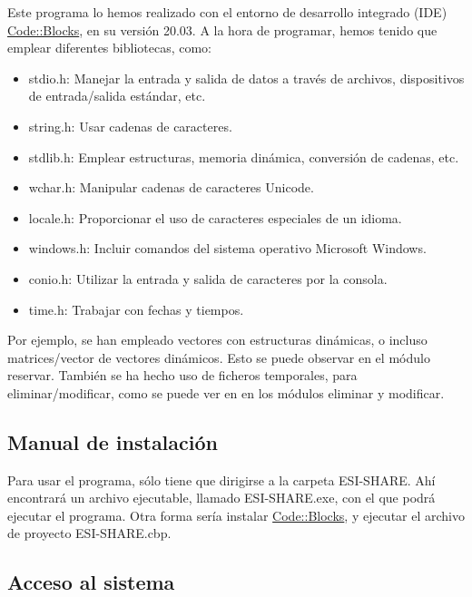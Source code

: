 Este programa lo hemos realizado con el entorno de desarrollo integrado (IDE) \href{https://www.codeblocks.org/}{Code::Blocks}, en su versión 20.03.
A la hora de programar, hemos tenido que emplear diferentes bibliotecas, como:
\begin{itemize}
  \item stdio.h: Manejar la entrada y salida de datos a través de archivos, dispositivos de entrada/salida estándar, etc.
  \item string.h: Usar cadenas de caracteres.
  \item stdlib.h: Emplear estructuras, memoria dinámica, conversión de cadenas, etc.
  \item wchar.h: Manipular cadenas de caracteres Unicode.
  \item locale.h: Proporcionar el uso de caracteres especiales de un idioma.
  \item windows.h: Incluir comandos del sistema operativo Microsoft Windows.
  \item conio.h: Utilizar la entrada y salida de caracteres por la consola.
  \item time.h: Trabajar con fechas y tiempos.
\end{itemize}

\bigskip

Por ejemplo, se han empleado vectores con estructuras dinámicas, o incluso matrices/vector de vectores dinámicos. Esto se puede observar en el módulo reservar.
También se ha hecho uso de ficheros temporales, para eliminar/modificar, como se puede ver en en los módulos eliminar y modificar.

\subsection{Manual de instalación}

Para usar el programa, sólo tiene que dirigirse a la carpeta ESI-SHARE. Ahí encontrará un archivo ejecutable, llamado ESI-SHARE.exe, con el que podrá ejecutar el programa.
Otra forma sería instalar \href{https://www.codeblocks.org/}{Code::Blocks}, y ejecutar el archivo de proyecto ESI-SHARE.cbp.

\subsection{Acceso al sistema}

